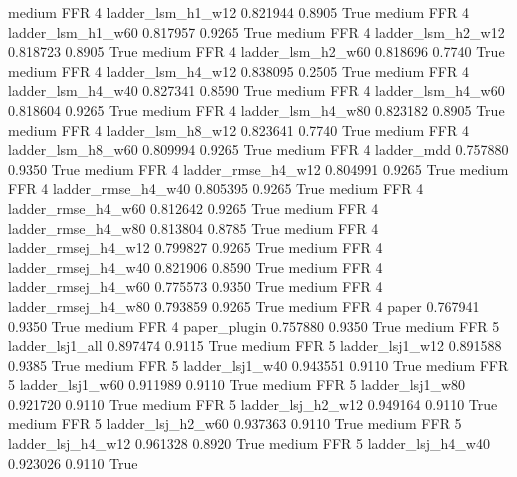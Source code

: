     medium      FFR                 4   ladder_lsm_h1_w12   0.821944      0.8905    True
    medium      FFR                 4   ladder_lsm_h1_w60   0.817957      0.9265    True
    medium      FFR                 4   ladder_lsm_h2_w12   0.818723      0.8905    True
    medium      FFR                 4   ladder_lsm_h2_w60   0.818696      0.7740    True
    medium      FFR                 4   ladder_lsm_h4_w12   0.838095      0.2505    True
    medium      FFR                 4   ladder_lsm_h4_w40   0.827341      0.8590    True
    medium      FFR                 4   ladder_lsm_h4_w60   0.818604      0.9265    True
    medium      FFR                 4   ladder_lsm_h4_w80   0.823182      0.8905    True
    medium      FFR                 4   ladder_lsm_h8_w12   0.823641      0.7740    True
    medium      FFR                 4   ladder_lsm_h8_w60   0.809994      0.9265    True
    medium      FFR                 4          ladder_mdd   0.757880      0.9350    True
    medium      FFR                 4  ladder_rmse_h4_w12   0.804991      0.9265    True
    medium      FFR                 4  ladder_rmse_h4_w40   0.805395      0.9265    True
    medium      FFR                 4  ladder_rmse_h4_w60   0.812642      0.9265    True
    medium      FFR                 4  ladder_rmse_h4_w80   0.813804      0.8785    True
    medium      FFR                 4 ladder_rmsej_h4_w12   0.799827      0.9265    True
    medium      FFR                 4 ladder_rmsej_h4_w40   0.821906      0.8590    True
    medium      FFR                 4 ladder_rmsej_h4_w60   0.775573      0.9350    True
    medium      FFR                 4 ladder_rmsej_h4_w80   0.793859      0.9265    True
    medium      FFR                 4               paper   0.767941      0.9350    True
    medium      FFR                 4        paper_plugin   0.757880      0.9350    True
    medium      FFR                 5     ladder_lsj1_all   0.897474      0.9115    True
    medium      FFR                 5     ladder_lsj1_w12   0.891588      0.9385    True
    medium      FFR                 5     ladder_lsj1_w40   0.943551      0.9110    True
    medium      FFR                 5     ladder_lsj1_w60   0.911989      0.9110    True
    medium      FFR                 5     ladder_lsj1_w80   0.921720      0.9110    True
    medium      FFR                 5   ladder_lsj_h2_w12   0.949164      0.9110    True
    medium      FFR                 5   ladder_lsj_h2_w60   0.937363      0.9110    True
    medium      FFR                 5   ladder_lsj_h4_w12   0.961328      0.8920    True
    medium      FFR                 5   ladder_lsj_h4_w40   0.923026      0.9110    True
